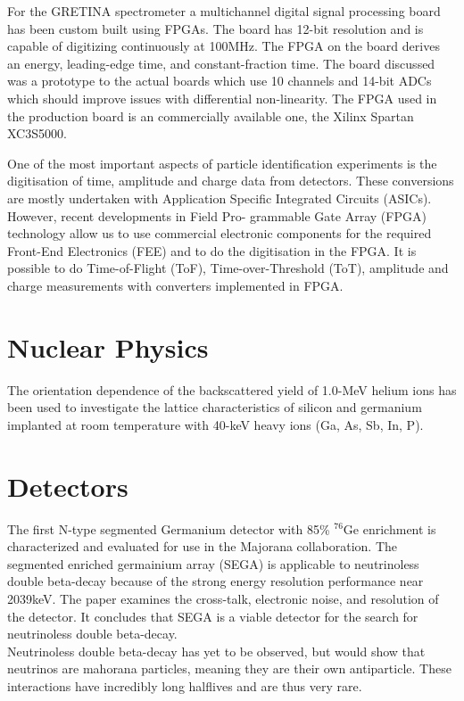 \documentclass[12pt]{article}
\begin{document}
{\large\textbf{\cite{Cromaz}}}

For the GRETINA spectrometer a multichannel digital signal processing board has been custom built using FPGAs. The board has 12-bit resolution and is capable of digitizing continuously at 100MHz. The FPGA on the board derives an energy, leading-edge time, and constant-fraction time. The board discussed was a prototype to the actual boards which use 10 channels and 14-bit ADCs which should improve issues with differential non-linearity. The FPGA used in the production board is an commercially available one, the Xilinx Spartan XC3S5000.
\\[20pt]


{\large\textbf{\cite{Ugur}}}

One of the most important aspects of particle identification experiments is the digitisation of time, amplitude and charge data from detectors. These conversions are mostly undertaken with Application Specific Integrated Circuits (ASICs). However, recent developments in Field Pro- grammable Gate Array (FPGA) technology allow us to use commercial electronic components for the required Front-End Electronics (FEE) and to do the digitisation in the FPGA. It is possible to do Time-of-Flight (ToF), Time-over-Threshold (ToT), amplitude and charge measurements with converters implemented in FPGA. 
\\[20pt]



\section{Nuclear Physics}


{\large\textbf{\cite{Mayer}}}

The orientation dependence of the backscattered yield of 1.0-MeV helium ions has been used to investigate the lattice characteristics of silicon and germanium implanted at room temperature with 40-keV heavy ions (Ga, As, Sb, In, P). 
\\[20pt]


\section{Detectors}

{\large\textbf{\cite{Leviner201466}}}

The first N-type segmented Germanium detector with 85\% $^{76}\mbox{Ge}$ enrichment is characterized and evaluated for use in the Majorana collaboration. The segmented enriched germainium array (SEGA) is applicable to neutrinoless double beta-decay because of the strong energy resolution performance near 2039keV. The paper examines the cross-talk, electronic noise, and resolution of the detector. It concludes that SEGA is a viable detector for the search for neutrinoless double beta-decay.
\\
Neutrinoless double beta-decay has yet to be observed, but would show that neutrinos are mahorana particles, meaning they are their own antiparticle. These interactions have incredibly long halflives and are thus very rare.
\\[20pt]
\end{document}
